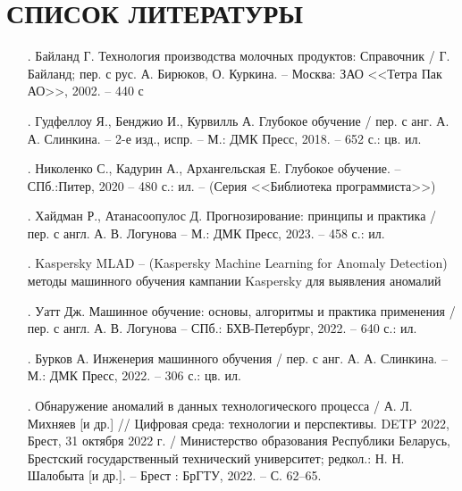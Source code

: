\sectionbreak \section*{ 
    \gostTitleFont
    \redline
    СПИСОК ЛИТЕРАТУРЫ
}
\titlespace

{\gostFont

\begin{itemize}[leftmargin=2.15cm, labelwidth=0.65cm, labelsep=0.0cm] 

    \item[\theimagecntr.] Байланд Г. Технология производства молочных продуктов: Справочник / Г. Байланд; пер. с рус. А. Бирюков, О. Куркина. {--} Москва: ЗАО <<Тетра Пак АО>>, 2002. {--} 440 с
    \addtocounter{imagecntr}{1}

    \item[\theimagecntr.] Гудфеллоу Я., Бенджио И., Курвилль А. Глубокое обучение / пер. с анг. А. А. Слинкина. {--} 2-е изд., испр. {--} М.: ДМК Пресс, 2018. {--} 652 с.: цв. ил. 
    \addtocounter{imagecntr}{1}

    \item[\theimagecntr.] Николенко С., Кадурин А., Архангельская Е. Глубокое обучение. {--} СПб.:Питер, 2020 {--} 480 с.: ил. {--} (Серия <<Библиотека программиста>>)
    \addtocounter{imagecntr}{1}

    \item[\theimagecntr.] Хайдман Р., Атанасоопулос Д. Прогнозирование: принципы и практика / пер. с англ. А. В. Логунова {--} М.: ДМК Пресс, 2023. {--} 458 с.: ил. 
    \addtocounter{imagecntr}{1}

    \item[\theimagecntr.] Kaspersky MLAD {--} (Kaspersky Machine Learning for Anomaly Detection) методы машинного обучения кампании Kaspersky для выявления аномалий
    \addtocounter{imagecntr}{1}

    \item[\theimagecntr.] Уатт Дж. Машинное обучение: основы, алгоритмы и практика применения / пер. с англ. А. В. Логунова {--} СПб.: БХВ-Петербург, 2022. {--} 640 с.: ил. 
    \addtocounter{imagecntr}{1}

    \item[\theimagecntr.] Бурков А. Инженерия машинного обучения / пер. с анг. А. А. Слинкина. {--} М.: ДМК Пресс, 2022. {--} 306 с.: цв. ил.
    \addtocounter{imagecntr}{1}

    \item[\theimagecntr.] Обнаружение аномалий в данных технологического процесса / А. Л. Михняев [и др.] // Цифровая среда: технологии и перспективы. DETP 2022, Брест, 31 октября 2022 г. / Министерство образования Республики Беларусь, Брестский государственный технический университет; редкол.: Н. Н. Шалобыта [и др.]. {--} Брест : БрГТУ, 2022. {--} С. 62–65.
    \addtocounter{imagecntr}{1}


\end{itemize}}
